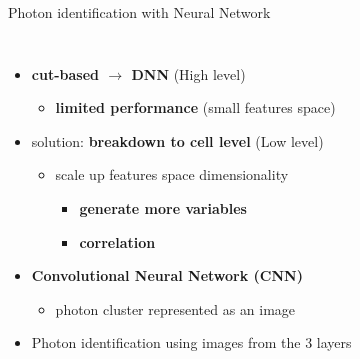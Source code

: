 \begin{frame}{Photon identification with Neural Network}
\begin{columns}
\begin{itemize}
    \item \textbf{cut-based $\to$ DNN} (High level)
    \begin{itemize}
        \item \textcolor{HHred}{\textbf{limited performance}} (small features space)
    \end{itemize}
    \pause
    \item solution: \textbf{\textcolor{HHturquoise_d}{breakdown to cell level}} (Low level)
    \begin{itemize}
        \item scale up features space dimensionality
        \begin{itemize}
            \item \textbf{generate more variables}
            \item \textbf{correlation}
        \end{itemize} 
    \end{itemize}
    \pause
    \item \textcolor{structurColor}{\textbf{Convolutional Neural Network (CNN)}}
    \begin{itemize}
        \item photon cluster represented as an image
    \end{itemize}
    \item Photon identification using images from the 3 layers 
\end{itemize}    


\end{columns}
\end{frame}

